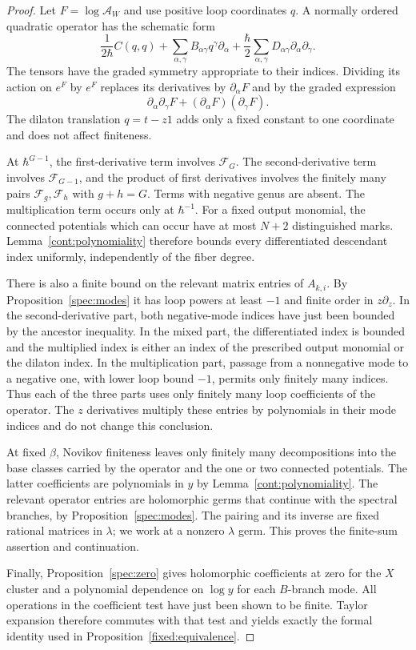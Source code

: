 \begin{proof}
Let $F=\log\mathcal A_W$ and use positive loop coordinates $q$.
A normally ordered quadratic operator has the schematic form
\[
 \frac{1}{2\hbar}C(q,q)
       +\sum_{\alpha,\gamma}B_{\alpha\gamma}q^\gamma
                    \partial_\alpha
       +\frac{\hbar}{2}
          \sum_{\alpha,\gamma}D_{\alpha\gamma}
                    \partial_\alpha\partial_\gamma .
\]
The tensors have the graded symmetry appropriate to their indices.
Dividing its action on $e^F$ by $e^F$ replaces its derivatives by
$\partial_\alpha F$ and by the graded expression
\[
 \partial_\alpha\partial_\gamma F+
                  (\partial_\alpha F)(\partial_\gamma F).
\]
The dilaton translation $q=t-z1$ adds only a fixed constant to
one coordinate and does not affect finiteness.

At $\hbar^{G-1}$, the first-derivative term involves
$\mathcal F_G$. The second-derivative term involves
$\mathcal F_{G-1}$, and the product of first derivatives involves
the finitely many pairs $\mathcal F_g,\mathcal F_h$ with
$g+h=G$. Terms with negative genus are absent. The multiplication
term occurs only at $\hbar^{-1}$. For a fixed output monomial,
the connected potentials which can occur have at most $N+2$
distinguished marks. Lemma~\ref{cont:polynomiality} therefore
bounds every differentiated descendant index uniformly,
independently of the fiber degree.

There is also a finite bound on the relevant matrix entries of
$A_{k,i}$. By Proposition~\ref{spec:modes} it has loop powers
at least $-1$ and finite order in $z\partial_z$.
In the second-derivative part, both negative-mode indices have
just been bounded by the ancestor inequality. In the mixed
part, the differentiated index is bounded and the multiplied
index is either an index of the prescribed output monomial or
the dilaton index. In the multiplication part, passage from
a nonnegative mode to a negative one, with lower loop bound
$-1$, permits only finitely many indices. Thus each of the
three parts uses only finitely many loop coefficients of
the operator. The $z$ derivatives multiply these entries by
polynomials in their mode indices and do not change this
conclusion.

At fixed $\beta$, Novikov finiteness leaves only finitely many
decompositions into the base classes carried by the operator
and the one or two connected potentials. The latter
coefficients are polynomials in $y$ by
Lemma~\ref{cont:polynomiality}. The relevant operator entries
are holomorphic germs that continue with the spectral branches,
by Proposition~\ref{spec:modes}. The pairing and its inverse
are fixed rational matrices in $\lambda$; we work at a nonzero
$\lambda$ germ. This proves the finite-sum assertion and
continuation.

Finally, Proposition~\ref{spec:zero} gives holomorphic
coefficients at zero for the $X$ cluster and a polynomial
dependence on $\log y$ for each $B$-branch mode. All operations
in the coefficient test have just been shown to be finite.
Taylor expansion therefore commutes with that test and yields
exactly the formal identity used in
Proposition~\ref{fixed:equivalence}.
\end{proof}

